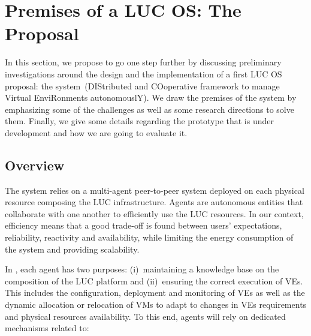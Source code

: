 \section{Premises of a LUC OS: The \discovery Proposal\label{sec:archi}}

In this section, we propose to go one step further by discussing preliminary
investigations around the design and the implementation of a first LUC OS
proposal: the \discovery system~(DIStributed and COoperative framework to manage
Virtual EnviRonments autonomouslY). We draw the premises of the \discovery
system by emphasizing some of the challenges as well as some research directions
to solve them. Finally, we give some details regarding the prototype that is
under development and how we are going to evaluate it.  

\subsection{Overview}

The \discovery system relies on a multi-agent peer-to-peer system deployed on
each physical resource composing the LUC infrastructure. Agents are autonomous
entities that collaborate with one another to efficiently use the LUC resources. In our context,
efficiency means that a good trade-off is found between users'
expectations, reliability, reactivity and availability,
while limiting the energy consumption of the system and providing
scalability. 

In \discovery, each agent has two purposes: (i)~maintaining a knowledge base on the
composition of the LUC platform and (ii)~ensuring the correct execution of VEs. 
This includes the configuration, deployment and monitoring of
VEs as well as the dynamic allocation or relocation of VMs to adapt to changes
in VEs requirements and physical resources availability. To this end, agents
will rely on dedicated mechanisms related to: 

